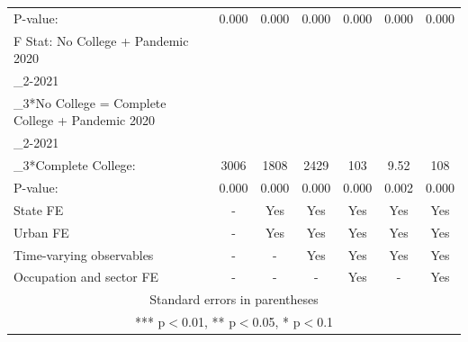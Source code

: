 \begin{tabular}{lcccccc}
\hspace{1mm} P-value: & 0.000 & 0.000 & 0.000 & 0.000 & 0.000 & 0.000 \\
F Stat: No College + Pandemic 2020\\_2-2021\\_3*No College = Complete College + Pandemic 2020\\_2-2021\\_3*Complete College: & 3006 & 1808 & 2429 & 103 & 9.52 & 108 \\
\hspace{1mm} P-value: & 0.000 & 0.000 & 0.000 & 0.000 & 0.002 & 0.000 \\
State FE & - & Yes & Yes & Yes & Yes & Yes \\
Urban FE & - & Yes & Yes & Yes & Yes & Yes \\
Time-varying observables & - & - & Yes & Yes & Yes & Yes \\
 Occupation and sector FE & - & - & - & Yes & - & Yes \\ \hline
\multicolumn{7}{c}{ Standard errors in parentheses} \\
\multicolumn{7}{c}{ *** p$<$0.01, ** p$<$0.05, * p$<$0.1} \\
\end{tabular}
